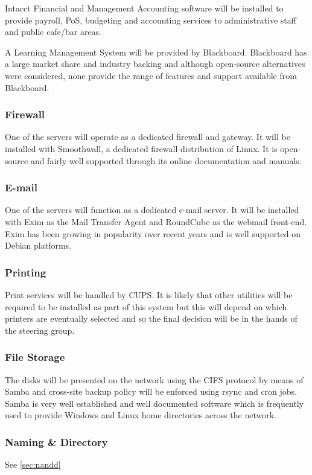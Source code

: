 \documentclass[a4paper, twoside]{article}
\begin{document}
Intacct Financial and Management Accounting software will be installed to
provide payroll, PoS, budgeting and accounting services to administrative staff
and public cafe/bar areas.

A Learning Management System will be provided by Blackboard. Blackboard has a
large market share and industry backing \cite{bb} and although open-source
alternatives were considered, none provide the range of features and support
available from Blackboard.

\subsubsection{Firewall}
One of the servers will operate as a dedicated firewall and gateway. It will be
installed with Smoothwall, a dedicated firewall distribution of Linux. It is
open-source and fairly well supported through its online documentation and
manuals.

\subsubsection{E-mail}
One of the servers will function as a dedicated e-mail server. It will be
installed with Exim as the Mail Transfer Agent and RoundCube as the webmail
front-end. Exim has been growing in popularity over recent years and is well
supported on Debian platforms\cite{exim}.

\subsubsection{Printing}
Print services will be handled by CUPS. It is likely that other utilities will
be required to be installed as part of this system but this will depend on which
printers are eventually selected and so the final decision will be in the hands
of the steering group.

\subsubsection{File Storage}
The disks will be presented on the network using the CIFS protocol by means of
Samba and cross-site backup policy will be enforced using rsync and cron jobs.
Samba is very well established and well documented software which is frequently
used to provide Windows and Linux home directories across the network.

\subsubsection{Naming \& Directory}
See \ref{sec:nandd}
\end{document}
